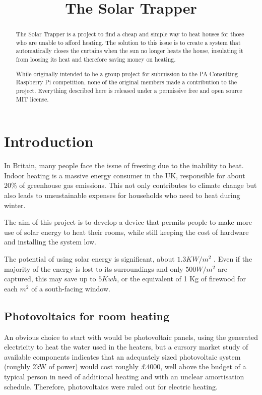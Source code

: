 \documentclass[a4paper,12pt]{article}
\title{The Solar Trapper}
\begin{document}
\maketitle
\begin{abstract}
    The Solar Trapper is a project to find a cheap and simple way to heat houses for those who are unable to afford heating. 
    The solution to this issue is to create a system that automatically closes the curtains when the sun no longer heats the house, 
    insulating it from loosing its heat and therefore saving money on heating.

    While originally intended to be a group project for submission to the PA Consulting Raspberry Pi competition, 
    none of the original members made a contribution to the project.
    Everything described here is released\cite{url:repo} under a permissive free and open source MIT license.
\end{abstract}
\tableofcontents
\section{Introduction}

In Britain, many people face the issue of freezing due to the inability to heat. 
Indoor heating is a massive energy consumer in the UK, responsible for about 20\% of greenhouse gas emissions\cite{url:energyUse}. 
This not only contributes to climate change but also leads to unsustainable expenses for households who need to heat during winter.

The aim of this project is to develop a device that permits people to make more use of solar energy to heat their rooms, 
while still keeping the cost of hardware and installing the system low. 

The potential of using solar energy is significant, about $1.3 KW/m^2$ \cite{url:solarConstant}. 
Even if the majority of the energy is lost to its surroundings and only $500 W/m^2$ are captured, 
this may save up to $5 Kwh$, or the equivalent of 1 Kg of firewood for each $m^2$ of a south-facing window. 

\subsection{Photovoltaics for room heating}

An obvious choice to start with would be photovoltaic panels, using the generated electricity to heat the water used in the heaters, 
but a cursory market study of available components indicates that an adequately sized photovoltaic system (roughly 2kW of power) 
would cost roughly £4000\cite{url:solarEnergyStore}, well above the budget of a typical person in need of additional heating  
and with an unclear amortisation schedule. 
Therefore, photovoltaics were ruled out for electric heating.
\end{document}
